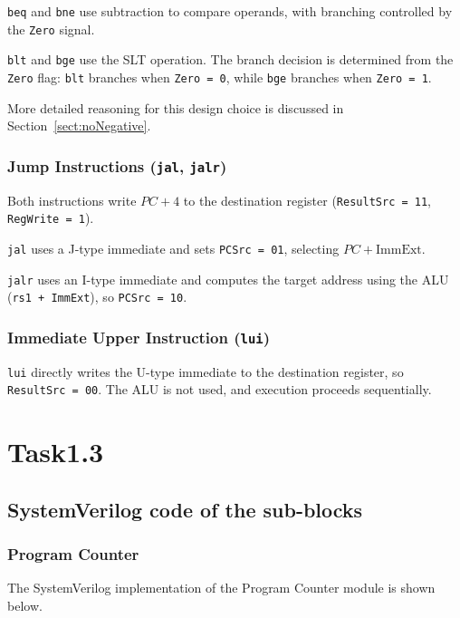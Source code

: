 \documentclass[acmsmall]{acmart}
\begin{document}
\texttt{beq} and \texttt{bne} use subtraction to compare operands, with branching controlled by the \texttt{Zero} signal.  

\texttt{blt} and \texttt{bge} use the SLT operation. The branch decision is determined from the \texttt{Zero} flag:  
\texttt{blt} branches when \texttt{Zero = 0}, while \texttt{bge} branches when \texttt{Zero = 1}.

More detailed reasoning for this design choice is discussed in Section~\ref{sect:noNegative}.

\subsubsection{Jump Instructions (\texttt{jal}, \texttt{jalr})}

Both instructions write $PC + 4$ to the destination register (\texttt{ResultSrc = 11}, \texttt{RegWrite = 1}).

\texttt{jal} uses a J-type immediate and sets \texttt{PCSrc = 01}, selecting $PC + \text{ImmExt}$.  

\texttt{jalr} uses an I-type immediate and computes the target address using the ALU (\texttt{rs1 + ImmExt}), so \texttt{PCSrc = 10}.

\subsubsection{Immediate Upper Instruction (\texttt{lui})}

\texttt{lui} directly writes the U-type immediate to the destination register, so \texttt{ResultSrc = 00}. The ALU is not used, and execution proceeds sequentially.

\section{Task1.3}
\subsection{SystemVerilog code of the sub-blocks}
\subsubsection{Program Counter}

The SystemVerilog implementation of the Program Counter module is shown below.


\end{document}
